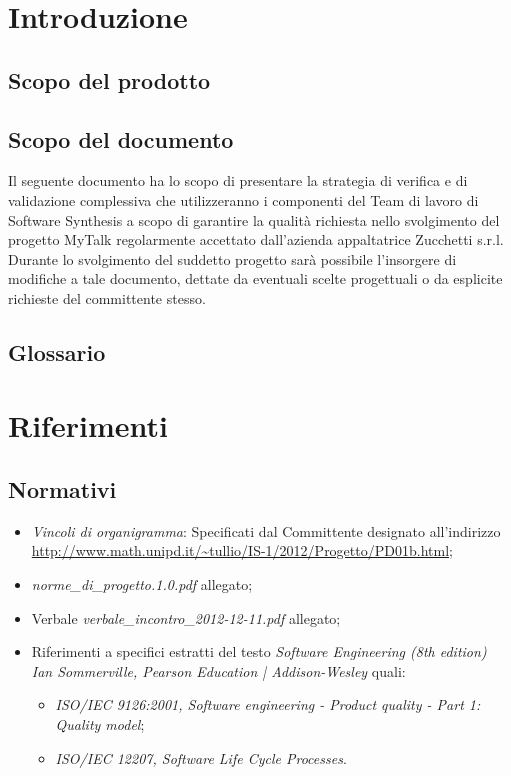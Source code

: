 

\setcounter{page}{1}
\pagestyle{normal}

\section{Introduzione}
\subsection{Scopo del prodotto}
\purpose

\subsection{Scopo del documento}
Il seguente documento ha lo scopo di presentare la strategia di verifica e di validazione complessiva che utilizzeranno i componenti del Team di lavoro di Software Synthesis a scopo di garantire la qualità richiesta nello svolgimento del progetto MyTalk regolarmente accettato dall'azienda appaltatrice Zucchetti s.r.l.\\
Durante lo svolgimento del suddetto progetto sarà possibile l'insorgere di modifiche a tale documento, dettate da eventuali scelte progettuali o da esplicite richieste del committente stesso.
\subsection{Glossario}
\glossaryIntro
\clearpage
\section{Riferimenti}
\subsection{Normativi}
\begin{itemize}
\item[] \textit{Vincoli di organigramma}: Specificati dal Committente designato all'indirizzo\\ \url{http://www.math.unipd.it/~tullio/IS-1/2012/Progetto/PD01b.html};
\item[] \textit{norme\_di\_progetto.1.0.pdf} allegato;
\item[]  Verbale \textit{verbale\_incontro\_2012-12-11.pdf} allegato;
\item[]  Riferimenti a specifici estratti del testo \textit{Software Engineering (8th edition) Ian Sommerville, Pearson Education | Addison-Wesley} quali:
\begin{itemize}
\item[]  \textit{ISO/IEC 9126:2001, Software engineering - Product quality - Part 1: Quality model};
\item[]  \textit{ISO/IEC 12207, Software Life Cycle Processes}.
\end{itemize}
\end{itemize}
